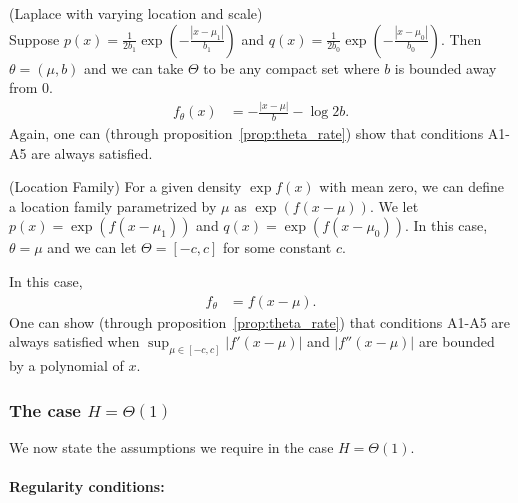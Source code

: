 \begin{example} (Laplace  with varying location and scale)\\
Suppose $p(x) = \frac{1}{2b_1} \exp\left( - \frac{|x - \mu_1|}{b_1} \right)$ and $q(x) = \frac{1}{2b_0} \exp\left( - \frac{|x - \mu_0|}{b_0} \right)$. Then $\theta = (\mu, b)$ and we can take $\Theta$ to be any compact set where $b$ is bounded away from 0.
\begin{align*}
f_{\theta}(x) &= - \frac{|x - \mu|}{b} - \log 2b.
\end{align*}
Again, one can (through proposition~\ref{prop:theta_rate}) show that conditions A1-A5 are always satisfied.
\end{example}

\begin{example} (Location Family)
For a given density $\exp f(x)$ with mean zero, we can define a location family parametrized by $\mu$ as $\exp( f(x - \mu))$. We let $p(x) = \exp( f( x - \mu_1))$ and $q(x) = \exp( f ( x - \mu_0))$. In this case, $\theta = \mu$ and we can let $\Theta = [-c, c]$ for some constant $c$. 

In this case, 
\begin{align*}
f_{\theta} &= f( x - \mu).
\end{align*}
One can show (through proposition~\ref{prop:theta_rate}) that conditions A1-A5 are always satisfied when $\sup_{\mu \in [-c, c]} | f'(x-  \mu) |$ and $| f''(x - \mu) |$ are bounded by a polynomial of $x$.

\end{example}


\subsubsection{The case $H = \Theta(1)$}

We now state the assumptions we require in the case $H = \Theta(1)$.

\paragraph{\textbf{Regularity conditions:}} 

